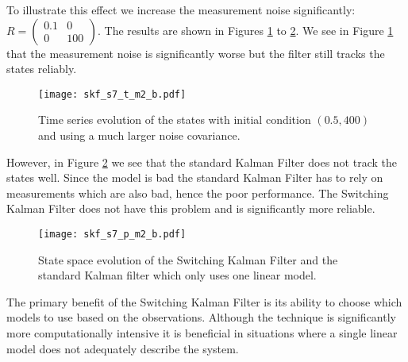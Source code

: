 To illustrate this effect we increase the measurement noise significantly: $R=\begin{pmatrix}
0.1 & 0 \\ 0 & 100
\end{pmatrix}$. The results are shown in Figures  \ref{fig_7mod_t_m2_b} to \ref{fig_7mod_p_m2_b}. We see in Figure \ref{fig_7mod_t_m2_b} that the measurement noise is significantly worse but the filter still tracks the states reliably.
\begin{figure}[H] 
\centering
\texttt{[image: skf\_s7\_t\_m2\_b.pdf]}
\caption{Time series evolution of the states with initial condition $(0.5, 400)$ and using a much larger noise covariance.}
\label{fig_7mod_t_m2_b}
\end{figure}
However, in Figure \ref{fig_7mod_p_m2_b} we see that the standard Kalman Filter does not track the states well. Since the model is bad the standard Kalman Filter has to rely on measurements which are also bad, hence the poor performance. The Switching Kalman Filter does not have this problem and is significantly more reliable.
\begin{figure}[H] 
\centering
\texttt{[image: skf\_s7\_p\_m2\_b.pdf]}
\caption{State space evolution of the Switching Kalman Filter and the standard Kalman filter which only uses one linear model.}
\label{fig_7mod_p_m2_b}
\end{figure}
The primary benefit of the Switching Kalman Filter is its ability to choose which models to use based on the observations. Although the technique is significantly more computationally intensive it is beneficial in situations where a single linear model does not adequately describe the system. 
